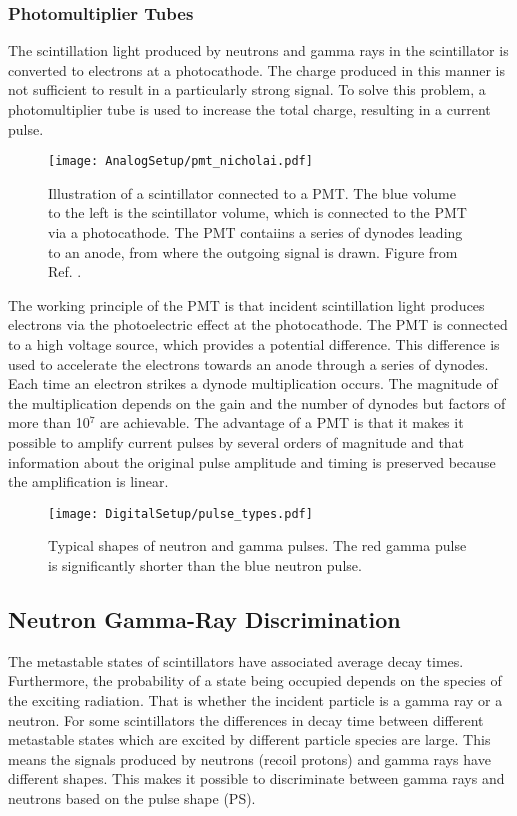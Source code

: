 \documentclass[main.tex]{subfiles}
\begin{document}
\subsubsection{Photomultiplier Tubes}
The scintillation light produced by neutrons and gamma rays in the scintillator is converted to electrons at a photocathode. The charge produced in this manner is not sufficient to result in a particularly strong signal. To solve this problem, a photomultiplier tube is used to increase the total charge, resulting in a current pulse. 

\begin{figure}[ht]
	\centering
    	\texttt{[image: AnalogSetup/pmt\_nicholai.pdf]}
        \caption[Illustration of a scintillator connected to a PMT]{Illustration of a scintillator connected to a PMT. The blue volume to the left is the scintillator volume, which is connected to the PMT via a photocathode. The PMT contaiins a series of dynodes leading to an anode, from where the outgoing signal is drawn. Figure from Ref. \cite{Mauritzsson}.}
	    \label{fig:pmt} 
\end{figure}

The working principle of the PMT is that incident scintillation light produces electrons via the photoelectric effect at the photocathode. The PMT is connected to a high voltage source, which provides a potential difference. This difference is used to accelerate the electrons towards an anode through a series of dynodes. Each time an electron strikes a dynode multiplication occurs. The magnitude of the multiplication depends on the gain and the number of dynodes but factors of more than 10$^\text{7}$ are achievable. 
The advantage of a PMT is that it makes it possible to amplify current pulses by several orders of magnitude and that information about the original pulse amplitude and timing is preserved because the amplification is linear.



\begin{figure}[ht]
	\centering
    	\texttt{[image: DigitalSetup/pulse\_types.pdf]}
        \caption{Typical shapes of neutron and gamma pulses. The red gamma pulse is significantly shorter than the blue neutron pulse.}
	    \label{fig:pulse_types} 
\end{figure}
\subsection{Neutron Gamma-Ray Discrimination}
The metastable states of scintillators have associated average decay times. Furthermore, the probability of a state being occupied depends on the species of the exciting radiation\cite{Krane}. That is whether the incident particle is a gamma ray or a neutron. For some scintillators the differences in decay time between different metastable states which are excited by different particle species are large. This means the signals produced by neutrons (recoil protons) and gamma rays have different shapes. This makes it possible to discriminate between gamma rays and neutrons based on the pulse shape (PS). 
\end{document}
